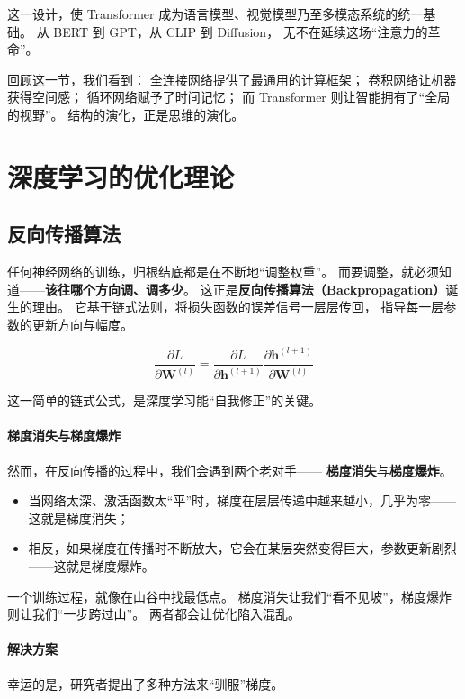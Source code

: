 这一设计，使 Transformer 成为语言模型、视觉模型乃至多模态系统的统一基础。  
从 BERT 到 GPT，从 CLIP 到 Diffusion，  
无不在延续这场“注意力的革命”。

回顾这一节，我们看到：  
全连接网络提供了最通用的计算框架；  
卷积网络让机器获得空间感；  
循环网络赋予了时间记忆；  
而 Transformer 则让智能拥有了“全局的视野”。  
结构的演化，正是思维的演化。

\section{深度学习的优化理论}

\subsection{反向传播算法}

任何神经网络的训练，归根结底都是在不断地“调整权重”。  
而要调整，就必须知道——\textbf{该往哪个方向调、调多少}。  
这正是\textbf{反向传播算法（Backpropagation）}诞生的理由。  
它基于链式法则，将损失函数的误差信号一层层传回，  
指导每一层参数的更新方向与幅度。

$$\frac{\partial L}{\partial \mathbf{W}^{(l)}} = \frac{\partial L}{\partial \mathbf{h}^{(l+1)}} \frac{\partial \mathbf{h}^{(l+1)}}{\partial \mathbf{W}^{(l)}}$$

这一简单的链式公式，是深度学习能“自我修正”的关键。

\paragraph{梯度消失与梯度爆炸}  
然而，在反向传播的过程中，我们会遇到两个老对手——  
\textbf{梯度消失}与\textbf{梯度爆炸}。

\begin{itemize}
\item 当网络太深、激活函数太“平”时，梯度在层层传递中越来越小，几乎为零——这就是梯度消失；
\item 相反，如果梯度在传播时不断放大，它会在某层突然变得巨大，参数更新剧烈——这就是梯度爆炸。
\end{itemize}

一个训练过程，就像在山谷中找最低点。  
梯度消失让我们“看不见坡”，梯度爆炸则让我们“一步跨过山”。  
两者都会让优化陷入混乱。

\paragraph{解决方案}  
幸运的是，研究者提出了多种方法来“驯服”梯度。  

